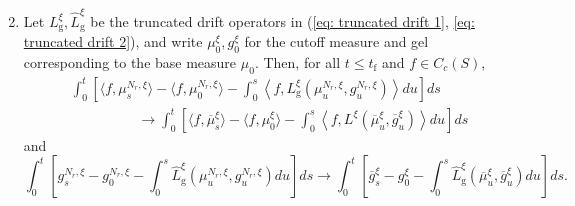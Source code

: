 \begin{lemma}
\begin{enumerate}[label=\roman{*}).]
\begin{equation*}
\end{equation*}
\item Let $L^\xi_\mathrm{g}, \widehat{L}^\xi_\mathrm{g}$ be the truncated drift operators in (\ref{eq: truncated drift 1}, \ref{eq: truncated drift 2}), and write $\mu^\xi_0, g^\xi_0$ for the cutoff measure and gel corresponding to the base measure $\mu_0$. Then, for all $t\le t_\mathrm{f}$ and $f\in C_c(S)$, \begin{equation}\begin{split} &\int_0^t \left[\langle f, \mu^{N_r,\xi}_s\rangle-\langle f,\mu^{N_r,\xi}_0\rangle -\int_0^s\left\langle f, L^\xi_\mathrm{g}\left(\mu^{N_r,\xi}_u,g^{N_r,\xi}_u\right)\right\rangle du\right]ds \\& \hspace{2cm} \rightarrow \int_0^t \left[\langle f, \overline{\mu}^{\xi}_s\rangle-\langle f,\mu^{\xi}_0\rangle -\int_0^s\left\langle f, L^\xi\left(\overline{\mu}^{\xi}_u,\overline{g}^\xi_u\right)\right\rangle du\right]ds \end{split}\end{equation} and \begin{equation} \int_0^t \left[g^{N_r,\xi}_s-g^{N_r,\xi}_0-\int_0^s \widehat{L}^\xi_\mathrm{g}(\mu^{N_r,\xi}_u,g^{N_r,\xi}_u)du\right]ds \rightarrow \int_0^t \left[\overline{g}^{\xi}_s-g^{\xi}_0-\int_0^s \widehat{L}^\xi_\mathrm{g}(\overline{\mu}^{\xi}_u,\overline{g}^{\xi}_u)du\right]ds. \end{equation}
\end{enumerate}
\end{lemma}
